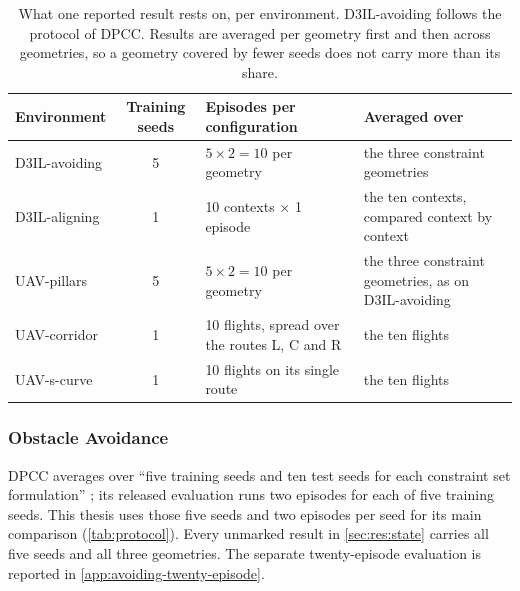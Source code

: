 \begin{table}[htpb]
  \caption[Evaluation protocol per environment]{What one reported result rests on, per environment.
  D3IL-avoiding follows the protocol of \ac{DPCC}. Results are averaged per geometry first and then
  across geometries, so a geometry covered by fewer seeds does not carry more than its share.}
  \label{tab:protocol}
  \centering
  \small
  \setlength{\tabcolsep}{6pt}
  \renewcommand{\arraystretch}{1.2}
  \begin{tabularx}{\linewidth}{@{}l c L X@{}}
    \toprule
    Environment & Training seeds & Episodes per configuration & Averaged over \\
    \midrule
    D3IL-avoiding & 5
      & $5\times2 = 10$ per geometry
      & the three constraint geometries \\
    D3IL-aligning & 1
      & 10 contexts $\times$ 1 episode
      & the ten contexts, compared context by context \\
    UAV-pillars & 5 & $5\times2 = 10$ per geometry & the three constraint geometries, as on D3IL-avoiding \\
    UAV-corridor & 1 & 10 flights, spread over the routes L, C and R & the ten flights \\
    UAV-s-curve & 1 & 10 flights on its single route & the ten flights \\
    \bottomrule
  \end{tabularx}
\end{table}

\subsubsection{Obstacle Avoidance}\label{sec:setup:protocol:avoiding}

\ac{DPCC} averages over \enquote{five training seeds and ten test seeds for each constraint set
formulation} \parencite[Sec.~6.1]{romer2025diffusion}; its released evaluation runs two episodes for each of
five training seeds. This thesis uses those five seeds and two episodes per seed for its main comparison
(\autoref{tab:protocol}). Every unmarked result in \autoref{sec:res:state} carries all five seeds and all
three geometries. The separate twenty-episode evaluation is reported in
\autoref{app:avoiding-twenty-episode}.

